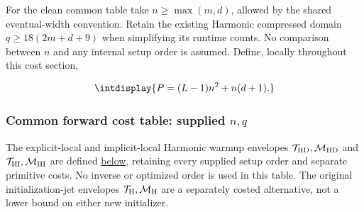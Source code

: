 
For the clean common table take \(n\ge\max(m,\allowbreak d)\), allowed by the shared eventual-width convention. Retain the existing Harmonic compressed domain \(q\ge18(2m+d+9)\) when simplifying its runtime counts. No comparison between \(n\) and any internal setup order is assumed. Define, locally throughout this cost section,


\begingroup\renewcommand{\theHequation}{intdisplay.217}
\begin{equation}
\intdisplay{
P=(L-1)n^2+n(d+1).
}
\label{int:eq-0098-cost-dense-size}
\end{equation}
\endgroup

\subsubsection{Common forward cost table: supplied \(n,\allowbreak q\)}
\label{int:cost-forward-table}


The explicit-local and implicit-local Harmonic warmup envelopes \(\mathcal T_{\rm HD},\allowbreak \mathcal M_{\rm HD}\) and \(\mathcal T_{\rm HI},\allowbreak \mathcal M_{\rm HI}\) are defined \hyperref[int:harmonic-efficient-initialization]{below}, retaining every supplied setup order and separate primitive costs. No inverse or optimized order is used in this table. The original initialization-jet envelopes \(\mathcal T_{\rm H},\allowbreak \mathcal M_{\rm H}\) are a separately costed alternative, not a lower bound on either new initializer.



